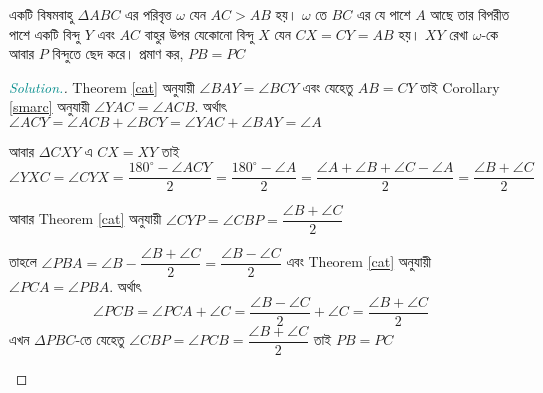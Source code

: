 \documentclass[a4paper,11pt]{article}
\newcommand{\drg}{^{\circ}}
\newenvironment{sltn}{\begin{proof}[\emph{\textcolor{darkcyan}{Solution.}}]} {\end{proof}}
\begin{document}
\begin{xmpl}
	একটি বিষমবাহু $\Delta ABC$ এর পরিবৃত্ত $\omega$ যেন $AC >AB$ হয়। $\omega$ তে $BC$ এর যে পাশে $A$ আছে তার বিপরীত পাশে একটি বিন্দু $Y$ এবং $AC$ বাহুর উপর যেকোনো বিন্দু $X$ যেন $CX=CY=AB$ হয়। $XY$ রেখা $\omega$-কে আবার $P$ বিন্দুতে ছেদ করে। প্রমাণ কর, $PB=PC$
\end{xmpl}
\begin{sltn} Theorem \ref{cat} অনুযায়ী $\angle BAY=\angle BCY$ এবং যেহেতু $AB=CY$ তাই Corollary \ref{smarc} অনুযায়ী $\angle YAC=\angle ACB$. অর্থাৎ $\angle ACY=\angle ACB+\angle BCY=\angle YAC+\angle BAY=\angle A$
	
	আবার $\Delta CXY$ এ $CX=XY$ তাই 
	\[\angle YXC=\angle CYX =\dfrac{180\drg-\angle ACY}{2}=\dfrac{180\drg-\angle A}{2}=\dfrac{\angle A+\angle B+\angle C-\angle A}{2}=\dfrac{\angle B+\angle C}{2}\]
	
	আবার Theorem \ref{cat} অনুযায়ী $\angle CYP=\angle CBP=\dfrac{\angle B+\angle C}{2}$
	
	তাহলে $\angle PBA=\angle B-\dfrac{\angle B+\angle C}{2}=\dfrac{\angle B-\angle C}{2}$ এবং Theorem \ref{cat} অনুযায়ী $\angle PCA=\angle PBA$. অর্থাৎ
	\[\angle PCB=\angle PCA+\angle C=\dfrac{\angle B-\angle C}{2}+\angle C=\dfrac{\angle B+\angle C}{2}\]
	এখন $\Delta PBC$-তে যেহেতু $\angle CBP=\angle PCB=\dfrac{\angle B+\angle C}{2}$ তাই $PB=PC$
	\begin{center}
	\end{center}
\end{sltn}
\end{document}
